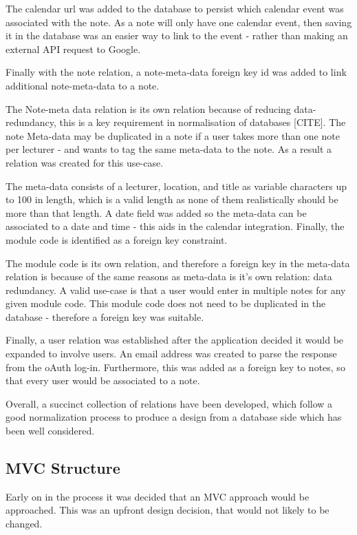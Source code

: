 The calendar url was added to the database to persist which calendar event was associated with the note. As a note will only have one calendar event, then saving it in the database was an easier way to link to the event - rather than making an external API request to Google.

Finally with the note relation, a note-meta-data foreign key id was added to link additional note-meta-data to a note.

The Note-meta data relation is its own relation because of reducing data-redundancy, this is a key requirement in normalisation of databases [CITE]. The note Meta-data may be duplicated in a note if a user takes more than one note per lecturer - and wants to tag the same meta-data to the note. As a result a relation was created for this use-case.

The meta-data consists of a lecturer, location, and title as variable characters up to 100 in length, which is a valid length as none of them realistically should be more than that length. A date field was added so the meta-data can be associated to a date and time - this aids in the calendar integration. Finally, the module code is identified as a foreign key constraint.

The module code is its own relation, and therefore a foreign key in the meta-data relation is because of the same reasons as meta-data is it's own relation: data redundancy. A valid use-case is that a user would enter in multiple notes for any given module code. This module code does not need to be duplicated in the database - therefore a foreign key was suitable.

Finally, a user relation was established after the application decided it would be expanded to involve users. An email address was created to parse the response from the oAuth log-in. Furthermore, this was added as a foreign key to notes, so that every user would be associated to a note.

Overall, a succinct collection of relations have been developed, which follow a good normalization process to produce a design from a database side which has been well considered.



\subsection{MVC Structure}
Early on in the process it was decided that an MVC approach would be approached. This was an upfront design decision, that would not likely to be changed.

